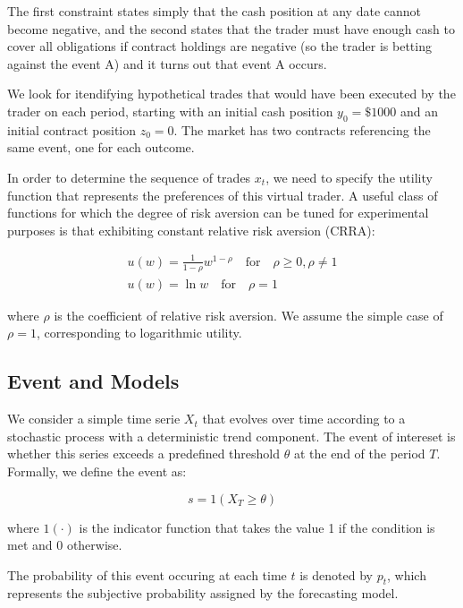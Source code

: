 The first constraint states simply that the cash position at any date cannot become 
negative, and the second states that the trader must have enough cash to cover 
all obligations if contract holdings are negative (so the trader is betting against the event A)
and it turns out that event A occurs.

We look for itendifying hypothetical 
trades that would have been executed by the trader on each period,
starting with an initial cash position $y_0 = \$ 1000$
and an initial contract position $z_0 = 0$. 
The market has two contracts 
referencing the same event, one for each outcome.

In order to determine the sequence of trades $x_t$, 
we need to specify the utility function 
that represents the preferences of this virtual trader. 
A useful class of functions for which the degree of risk aversion 
can be tuned for experimental purposes is that 
exhibiting constant relative risk aversion (CRRA):

\begin{equation}
    \begin{aligned}
        u(w) = \frac{1}{1 - \rho} w^{1 - \rho} \quad \text{for} \quad \rho \geq 0, \rho \neq 1 \\
        u(w) = \ln w \quad \text{for} \quad \rho = 1
    \end{aligned}
\end{equation}

where $\rho$ is the coefficient of relative risk aversion. 
We assume the simple case of $\rho = 1$, corresponding to logarithmic utility.

\subsection{Event and Models}

We consider a simple time serie $X_t$
that evolves over time according to a stochastic process 
with a deterministic trend component. 
The event of intereset is whether this series exceeds a 
predefined threshold $\theta$ at the end of the period $T$. 
Formally, we define the event as:

\begin{equation}
    s = 1(X_T \geq \theta)
\end{equation}

where $1(\cdot)$ is the indicator function that takes the value 
1 if the condition is met and 0 otherwise. 

The probability of this event occuring at each time $t$ is denoted by $p_t$,
which represents the subjective probability assigned by 
the forecasting model. 


